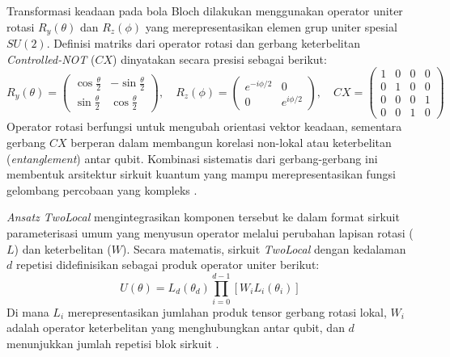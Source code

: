 Transformasi keadaan pada bola Bloch dilakukan menggunakan operator uniter rotasi $R_y(\theta)$ dan $R_z(\phi)$ yang merepresentasikan elemen grup uniter spesial $SU(2)$. Definisi matriks dari operator rotasi dan gerbang keterbelitan \textit{Controlled-NOT} ($CX$) dinyatakan secara presisi sebagai berikut:
\begin{equation}
R_y(\theta) = \begin{pmatrix} \cos\frac{\theta}{2} & -\sin\frac{\theta}{2} \\ \sin\frac{\theta}{2} & \cos\frac{\theta}{2} \end{pmatrix}, \quad R_z(\phi) = \begin{pmatrix} e^{-i\phi/2} & 0 \\ 0 & e^{i\phi/2} \end{pmatrix}, \quad CX = \begin{pmatrix} 1 & 0 & 0 & 0 \\ 0 & 1 & 0 & 0 \\ 0 & 0 & 0 & 1 \\ 0 & 0 & 1 & 0 \end{pmatrix}
\label{eq:quantum_gates_matrices}
\end{equation}
Operator rotasi berfungsi untuk mengubah orientasi vektor keadaan, sementara gerbang $CX$ berperan dalam membangun korelasi non-lokal atau keterbelitan (\textit{entanglement}) antar qubit. Kombinasi sistematis dari gerbang-gerbang ini membentuk arsitektur sirkuit kuantum yang mampu merepresentasikan fungsi gelombang percobaan yang kompleks \cite{nakahara_quantum_2008}.

\textit{Ansatz TwoLocal} mengintegrasikan komponen tersebut ke dalam format sirkuit parameterisasi umum yang menyusun operator melalui perubahan lapisan rotasi ($L$) dan keterbelitan ($W$). Secara matematis, sirkuit \textit{TwoLocal} dengan kedalaman $d$ repetisi didefinisikan sebagai produk operator uniter berikut:
\begin{equation}
U(\theta) = L_d(\theta_d) \prod_{i=0}^{d-1} [W_i L_i(\theta_i)]
\label{eq:twolocal_general}
\end{equation}
Di mana $L_i$ merepresentasikan jumlahan produk tensor gerbang rotasi lokal, $W_i$ adalah operator keterbelitan yang menghubungkan antar qubit, dan $d$ menunjukkan jumlah repetisi blok sirkuit \cite{cerezo_variational_2021}.


